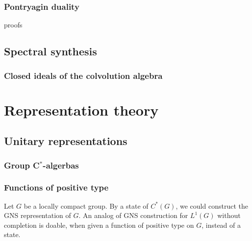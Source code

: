 \documentclass{../note}
\begin{document}
\section{Pontryagin duality}
proofs


\chapter{Spectral synthesis}
\section{Closed ideals of the colvolution algebra}








\part{Representation theory}
\chapter{Unitary representations}
\section{}
\begin{prb}
\end{prb}
\section{Group C$^*$-algerbas}
\begin{prb}
\end{prb}
\section{Functions of positive type}
\begin{prb}
\end{prb}
\begin{prb}
\end{prb}
\begin{prb}
Let $G$ be a locally compact group.
By a state of $C^*(G)$, we could construct the GNS representation of $G$.
An analog of GNS construction for $L^1(G)$ without completion is doable, when given a function of positive type on $G$, instead of a state.
\end{prb}
\end{document}
